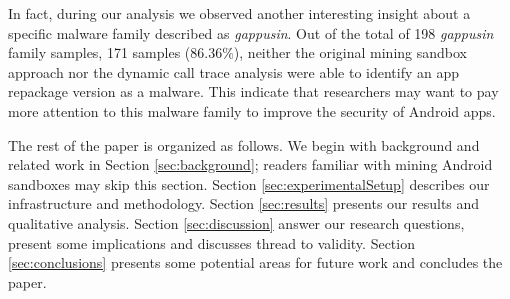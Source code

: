 In fact, during our analysis we observed another interesting insight about a specific malware family described as \textit{gappusin}. Out of the total of 198 \textit{gappusin} family samples, 171 samples ($86.36\%$), neither the original mining sandbox approach nor the dynamic call trace analysis were able to identify an app repackage version as a malware. This indicate that researchers may want to pay more attention to this malware family to improve the security of Android apps.




The rest of the paper is organized as follows. We begin with background and related work in Section \ref{sec:background};
readers familiar with mining Android sandboxes may skip this section.
Section \ref{sec:experimentalSetup} describes our infrastructure and methodology. Section \ref{sec:results} presents our results and qualitative analysis. Section \ref{sec:discussion} answer our research questions, present some implications and discusses thread to validity. Section \ref{sec:conclusions} 
presents some potential areas for future work and concludes the paper.
